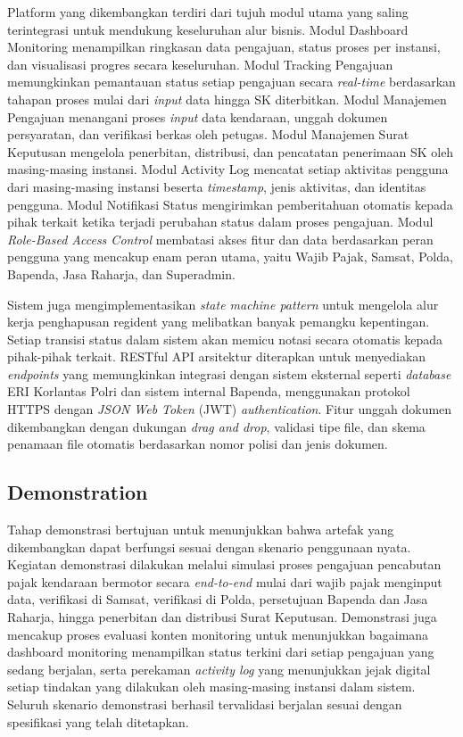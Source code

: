 \documentclass[conference]{IEEEtran}
\begin{document}
Platform yang dikembangkan terdiri dari tujuh modul utama yang saling terintegrasi
untuk mendukung keseluruhan alur bisnis. Modul Dashboard Monitoring menampilkan
ringkasan data pengajuan, status proses per instansi, dan visualisasi progres
secara keseluruhan. Modul Tracking Pengajuan memungkinkan pemantauan status setiap
pengajuan secara \emph{real-time} berdasarkan tahapan proses mulai dari \emph{input}
data hingga SK diterbitkan. Modul Manajemen Pengajuan menangani proses \emph{input}
data kendaraan, unggah dokumen persyaratan, dan verifikasi berkas oleh petugas.
Modul Manajemen Surat Keputusan mengelola penerbitan, distribusi, dan pencatatan
penerimaan SK oleh masing-masing instansi. Modul Activity Log mencatat setiap
aktivitas pengguna dari masing-masing instansi beserta \emph{timestamp}, jenis
aktivitas, dan identitas pengguna. Modul Notifikasi Status mengirimkan pemberitahuan
otomatis kepada pihak terkait ketika terjadi perubahan status dalam proses
pengajuan. Modul \emph{Role-Based Access Control} membatasi akses fitur dan data
berdasarkan peran pengguna yang mencakup enam peran utama, yaitu Wajib Pajak,
Samsat, Polda, Bapenda, Jasa Raharja, dan Superadmin.

Sistem juga mengimplementasikan \emph{state machine pattern} untuk mengelola alur
kerja penghapusan regident yang melibatkan banyak pemangku kepentingan. Setiap
transisi status dalam sistem akan memicu notasi secara otomatis kepada pihak-pihak
terkait. RESTful API arsitektur diterapkan untuk menyediakan \emph{endpoints} yang
memungkinkan integrasi dengan sistem eksternal seperti \emph{database} ERI Korlantas
Polri dan sistem internal Bapenda, menggunakan protokol HTTPS dengan \emph{JSON Web
Token} (JWT) \emph{authentication}. Fitur unggah dokumen dikembangkan dengan
dukungan \emph{drag and drop}, validasi tipe file, dan skema penamaan file
otomatis berdasarkan nomor polisi dan jenis dokumen.

\subsection{Demonstration}
\label{subsec:demonstration}

Tahap demonstrasi bertujuan untuk menunjukkan bahwa artefak yang dikembangkan dapat
berfungsi sesuai dengan skenario penggunaan nyata. Kegiatan demonstrasi dilakukan
melalui simulasi proses pengajuan pencabutan pajak kendaraan bermotor secara
\emph{end-to-end} mulai dari wajib pajak menginput data, verifikasi di Samsat,
verifikasi di Polda, persetujuan Bapenda dan Jasa Raharja, hingga penerbitan dan
distribusi Surat Keputusan. Demonstrasi juga mencakup proses evaluasi konten
monitoring untuk menunjukkan bagaimana dashboard monitoring menampilkan status
terkini dari setiap pengajuan yang sedang berjalan, serta perekaman \emph{activity
log} yang menunjukkan jejak digital setiap tindakan yang dilakukan oleh masing-masing
instansi dalam sistem. Seluruh skenario demonstrasi berhasil tervalidasi berjalan
sesuai dengan spesifikasi yang telah ditetapkan.
\end{document}
